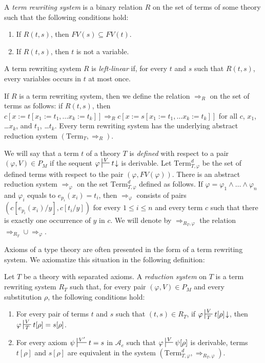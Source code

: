 \documentclass[reqno]{amsart}
\theoremstyle{definition}
\theoremstyle{remark}
\newcommand{\repl}{:=}
\newcommand{\Term}{\mathrm{Term}}
\numberwithin{figure}{section}
\begin{document}
A \emph{term rewriting system} is a binary relation $R$ on the set of terms of some theory such that the following conditions hold:
\begin{enumerate}
\item If $R(t,s)$, then $FV(s) \subseteq FV(t)$.
\item If $R(t,s)$, then $t$ is not a variable.
\end{enumerate}
A term rewriting system $R$ is \emph{left-linear} if, for every $t$ and $s$ such that $R(t,s)$, every variables occurs in $t$ at most once.

If $R$ is a term rewriting system, then we define the relation $\Rightarrow_R$ on the set of terms as follows:
if $R(t,s)$, then $c[x \repl t[x_1 \repl t_1, \ldots x_k \repl t_k]] \Rightarrow_R c[x \repl s[x_1 \repl t_1, \ldots x_k \repl t_k]]$ for all $c$, $x_1$, \ldots $x_k$, and $t_1$, \ldots $t_k$.
Every term rewriting system has the underlying abstract reduction system $(\Term_T,\Rightarrow_R)$.

We will say that a term $t$ of a theory $T$ is \emph{defined} with respect to a pair $(\varphi,V) \in P_M$ if the sequent $\varphi \sststile{}{V} t\!\downarrow$ is derivable.
Let $\Term_{T,\varphi}^d$ be the set of defined terms with respect to the pair $(\varphi,FV(\varphi))$.
There is an abstract reduction system $\Rightarrow_\varphi$ on the set $\Term_{T,\varphi}^d$ defined as follows.
If $\varphi = \varphi_1 \land \ldots \land \varphi_n$ and $\varphi_i$ equals to $e_{p_i}(x_i) = t_i$, then $\Rightarrow_\varphi$ consists of pairs $(c[e_{p_i}(x_i)/y],c[t_i/y])$
for every $1 \leq i \leq n$ and every term $c$ such that there is exactly one occurrence of $y$ in $c$.
We will denote by $\Rightarrow_{R_T,\varphi}$ the relation $\Rightarrow_{R_T} \cup \Rightarrow_\varphi$.

Axioms of a type theory are often presented in the form of a term rewriting system.
We axiomatize this situation in the following definition:

\begin{defn}[directed]
Let $T$ be a theory with separated axioms.
A \emph{reduction system} on $T$ is a term rewriting system $R_T$ such that, for every pair $(\varphi,V) \in P_M$ and every substitution $\rho$, the following conditions hold:
\begin{enumerate}
\item \label{it:dir-first} For every pair of terms $t$ and $s$ such that $(t,s) \in R_T$, if $\varphi \sststile{T}{V} t[\rho]\!\downarrow$, then $\varphi \sststile{T}{V} t[\rho] = s[\rho]$.
\item \label{it:dir-second} For every axiom $\psi \sststile{}{V'} t = s$ in $\mathcal{A}_e$ such that $\varphi \sststile{}{V} \psi[\rho]$ is derivable,
terms $t[\rho]$ and $s[\rho]$ are equivalent in the system $(\Term_{T,\varphi}^d,\Rightarrow_{R_T,\varphi})$.
\end{enumerate}
\end{defn}
\end{document}
